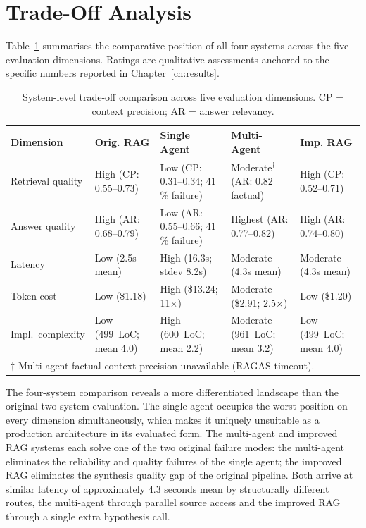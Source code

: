 \section{Trade-Off Analysis}
\label{sec:tradeoffs}

Table~\ref{tab:tradeoff} summarises the comparative position of all four systems across the five evaluation dimensions. Ratings are qualitative assessments anchored to the specific numbers reported in Chapter~\ref{ch:results}.

\begin{table}[ht]
\centering
\small
\setlength{\tabcolsep}{4pt}
\caption{System-level trade-off comparison across five evaluation dimensions. CP = context precision; AR = answer relevancy.}
\label{tab:tradeoff}
\begin{tabular}{l>{\raggedright\arraybackslash}p{2.7cm}>{\raggedright\arraybackslash}p{2.7cm}>{\raggedright\arraybackslash}p{2.7cm}>{\raggedright\arraybackslash}p{2.7cm}}
\hline
\textbf{Dimension} & \textbf{Orig. RAG} & \textbf{Single Agent} & \textbf{Multi-Agent} & \textbf{Imp. RAG} \\
\hline
Retrieval quality &
  High (CP: 0.55--0.73) &
  Low (CP: 0.31--0.34; 41\,\% failure) &
  Moderate$^\dagger$ (AR: 0.82 factual) &
  High (CP: 0.52--0.71) \\
Answer quality &
  High (AR: 0.68--0.79) &
  Low (AR: 0.55--0.66; 41\,\% failure) &
  Highest (AR: 0.77--0.82) &
  High (AR: 0.74--0.80) \\
Latency &
  Low (2.5s mean) &
  High (16.3s; stdev 8.2s) &
  Moderate (4.3s mean) &
  Moderate (4.3s mean) \\
Token cost &
  Low (\$1.18) &
  High (\$13.24; 11$\times$) &
  Moderate (\$2.91; 2.5$\times$) &
  Low (\$1.20) \\
Impl.\ complexity &
  Low (499~LoC; mean 4.0) &
  High (600~LoC; mean 2.2) &
  Moderate (961~LoC; mean 3.2) &
  Low (499~LoC; mean 4.0) \\
\hline
\multicolumn{5}{l}{\small $\dagger$ Multi-agent factual context precision unavailable (RAGAS timeout).} \\
\end{tabular}
\end{table}

The four-system comparison reveals a more differentiated landscape than the original two-system evaluation. The single agent occupies the worst position on every dimension simultaneously, which makes it uniquely unsuitable as a production architecture in its evaluated form. The multi-agent and improved RAG systems each solve one of the two original failure modes: the multi-agent eliminates the reliability and quality failures of the single agent; the improved RAG eliminates the synthesis quality gap of the original pipeline. Both arrive at similar latency of approximately 4.3 seconds mean by structurally different routes, the multi-agent through parallel source access and the improved RAG through a single extra hypothesis call.

